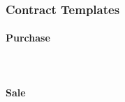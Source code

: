 \subsubsection{Contract Templates}
\label{app:muerp-contracts-templates}

\paragraph{Purchase}

~



\paragraph{Sale}

~



